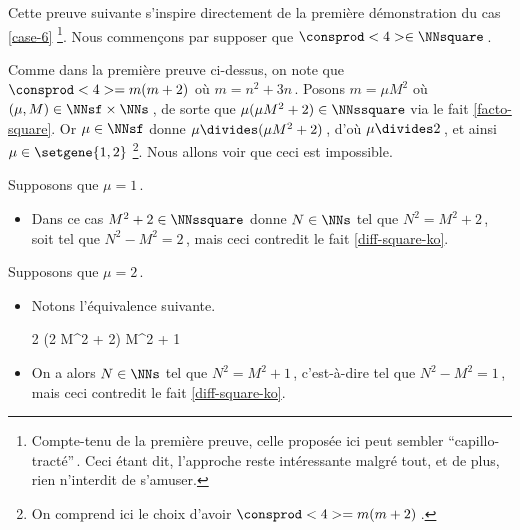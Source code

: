 Cette preuve suivante s'inspire directement de la première démonstration du cas \ref{case-6}
\footnote{
	Compte-tenu de la première preuve, celle proposée ici peut sembler \enquote{capillo-tracté}\,. Ceci étant dit, l'approche reste intéressante malgré tout, et de plus, rien n'interdit de s'amuser.
}.
Nous commençons par supposer que $\consprod<4> \in \NNsquare$\,.

\smallskip

Comme dans la première preuve ci-dessus, on note que $\consprod<4> = m (m + 2)$ où $m = n^2 + 3n$\,.
Posons $m = \mu M^2$ où $(\mu, M) \in \NNsf \times \NNs$\,,
de sorte que $\mu (\mu M^2 + 2) \in \NNssquare$ via le fait \ref{facto-square}.
Or $\mu \in \NNsf$ donne $\mu \divides (\mu M^2 + 2)$\,, 
d'où $\mu \divides 2$\,, et ainsi $\mu \in \setgene{1, 2}$
\footnote{
	On comprend ici le choix d'avoir $\consprod<4> = m (m + 2)$\,.
}.
Nous allons voir que ceci est impossible.

\medskip

Supposons que $\mu = 1$\,.
%
\begin{itemize}
	\item Dans ce cas $M^2 + 2 \in \NNssquare$ donne $N \in \NNs$ tel que $N^2 = M^2 + 2$\,, soit tel que $N^2 - M^2 = 2$\,, mais ceci contredit le fait \ref{diff-square-ko}.
\end{itemize}

\medskip

	Supposons que $\mu = 2$\,.
%
\begin{itemize}
	\item Notons l'équivalence suivante.
    
    \noindent\kern-6pt%
    \begin{stepcalc}[style=ar*, ope=\iff]
    	2 (2 M^2 + 2) \in \NNssquare
    	M^2 + 1 \in \NNssquare
    \end{stepcalc}

	\item On a alors $N \in \NNs$ tel que $N^2 = M^2 + 1$\,, c'est-à-dire tel que $N^2 - M^2 = 1$\,, mais ceci contredit le fait \ref{diff-square-ko}.
	\qedhere 
\end{itemize}